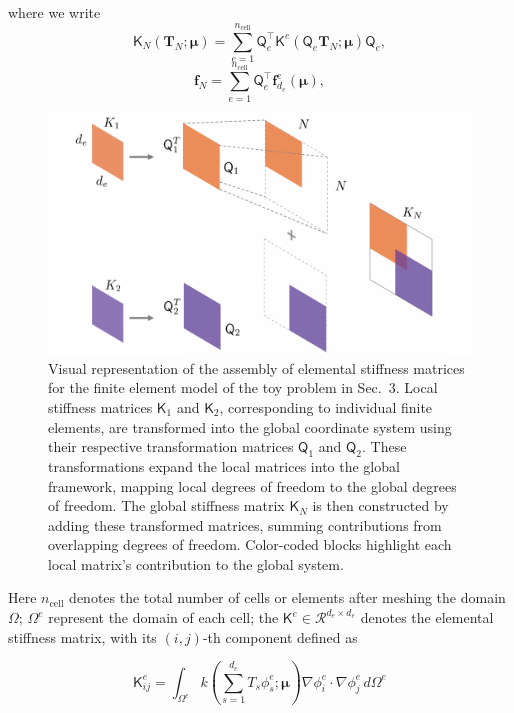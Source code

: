 \documentclass[11pt]{article}
\renewcommand{\vec}[1]{\mathbf{#1}}
\newcommand{\mat}[1]{\mathsf{#1}}
\begin{document}
where we write 
\begin{equation}
\mat{K}_N(\mathbf{T}_N; \boldsymbol\mu) = \sum_{e=1}^{n_{\text{cell}}} \mat{Q}_e^\top \mat{K}^e (\mat{Q}_e\mathbf{T}_N; \boldsymbol\mu) \mat{Q}_e,
\label{eq:elemental_contrib_K}
\end{equation}
\begin{equation}
\mathbf{f}_N = \sum_{e=1}^{n_{\text{cell}}} \mat{Q}_e^\top \vec{f}^e_{d_e}(\boldsymbol\mu),
\label{eq:elemental_contrib_f}
\end{equation}

\begin{figure}[t]
    \centering
    \includegraphics[width=0.6\linewidth]{K_full.pdf}
    \caption{Visual representation of the assembly of elemental stiffness matrices for the finite element model of the toy problem in Sec.~3. Local stiffness matrices \( \mat{K}_1 \) and \( \mat{K}_2 \), corresponding to individual finite elements, are transformed into the global coordinate system using their respective transformation matrices \( \mat{Q}_1 \) and \( \mat{Q}_2 \). These transformations expand the local matrices into the global framework, mapping local degrees of freedom to the global degrees of freedom. The global stiffness matrix \( \mat{K}_N \) is then constructed by adding these transformed matrices, summing contributions from overlapping degrees of freedom. Color-coded blocks highlight each local matrix's contribution to the global system.}
    \label{fig:visual_FOM_FEA}
\end{figure}


Here \( n_{\text{cell}} \) denotes the total number of cells or elements after meshing the domain \( \Omega \);  \( \Omega^e \) represent the domain of each cell; the \( \mat{K}^e\in\mathcal{R}^{d_e\times d_e} \) denotes the elemental stiffness matrix, with its $(i,j)$-th component defined as 

\begin{equation}
\mat{K}^e_{ij} = \int_{\Omega^{e}} k\left(\sum_{s=1}^{d_e} T_s \phi^e_s;\boldsymbol\mu\right) \nabla \phi^e_i \cdot \nabla \phi^e_j \, d\Omega^{e}
\label{eq:K_N_ij}
\end{equation}
\end{document}
